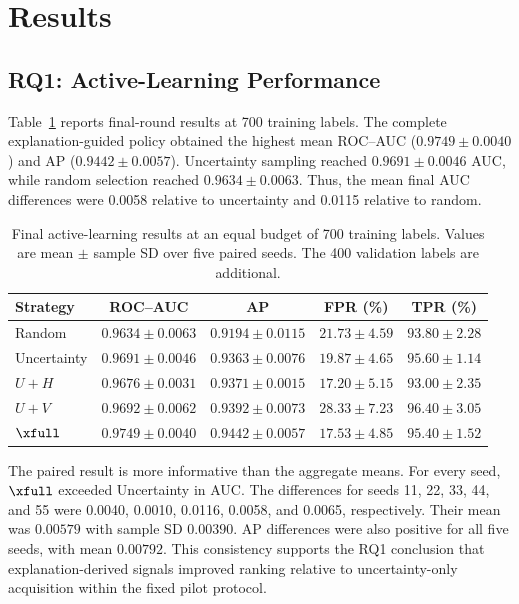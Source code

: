 \section{Results}
\label{sec:results}

\subsection{RQ1: Active-Learning Performance}

Table~\ref{tab:al-final} reports final-round results at 700 training labels. The
complete explanation-guided policy obtained the highest mean ROC--AUC
($0.9749\pm0.0040$) and AP ($0.9442\pm0.0057$). Uncertainty sampling reached
$0.9691\pm0.0046$ AUC, while random selection reached
$0.9634\pm0.0063$. Thus, the mean final AUC differences were 0.0058 relative to
uncertainty and 0.0115 relative to random.

\begin{table}[t]
\centering
\caption{Final active-learning results at an equal budget of 700 training labels. Values are mean $\pm$ sample SD over five paired seeds. The 400 validation labels are additional.}
\label{tab:al-final}
\small
\begin{tabular}{lcccc}
\toprule
Strategy & ROC--AUC & AP & FPR (\%) & TPR (\%) \\
\midrule
Random & $0.9634\pm0.0063$ & $0.9194\pm0.0115$ & $21.73\pm4.59$ & $93.80\pm2.28$ \\
Uncertainty & $0.9691\pm0.0046$ & $0.9363\pm0.0076$ & $19.87\pm4.65$ & $95.60\pm1.14$ \\
$U+H$ & $0.9676\pm0.0031$ & $0.9371\pm0.0015$ & $17.20\pm5.15$ & $93.00\pm2.35$ \\
$U+V$ & $0.9692\pm0.0062$ & $0.9392\pm0.0073$ & $28.33\pm7.23$ & $96.40\pm3.05$ \\
$\xfull$ & $\mathbf{0.9749\pm0.0040}$ & $\mathbf{0.9442\pm0.0057}$ & $17.53\pm4.85$ & $95.40\pm1.52$ \\
\bottomrule
\end{tabular}
\end{table}

The paired result is more informative than the aggregate means. For every seed,
$\xfull$ exceeded Uncertainty in AUC. The differences for seeds
11, 22, 33, 44, and 55 were 0.0040, 0.0010, 0.0116, 0.0058, and 0.0065,
respectively. Their mean was $0.00579$ with sample SD $0.00390$. AP differences
were also positive for all five seeds, with mean $0.00792$. This consistency
supports the RQ1 conclusion that explanation-derived signals improved ranking
relative to uncertainty-only acquisition within the fixed pilot protocol.

